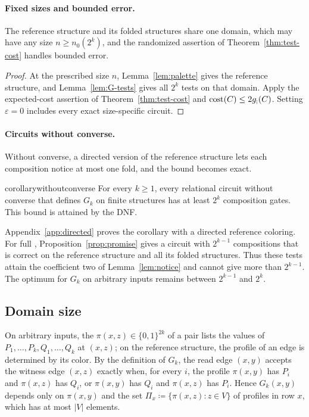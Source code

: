 \paragraph{Fixed sizes and bounded error.}
The reference structure and its folded structures share one domain,
which may have any size $n\ge n_0(2^k)$, and the randomized assertion of
Theorem~\ref{thm:test-cost} handles bounded error.
\randomizedbounds*
\begin{proof}
At the prescribed size $n$, Lemma~\ref{lem:palette} gives the reference
structure, and Lemma~\ref{lem:G-tests} gives all $2^k$ tests on that domain.
Apply the expected-cost assertion of Theorem~\ref{thm:test-cost} and
$\operatorname{cost}(C)\le2g_{;}(C)$. Setting $\varepsilon=0$ includes every exact
size-specific circuit.
\end{proof}

\paragraph{Circuits without converse.}
Without converse, a directed version of the reference structure lets
each composition notice at most one fold, and the bound becomes exact.
\begin{restatable}{corollary}{withoutconverse}\label{cor:without-converse}
For every $k\ge1$, every relational circuit without converse that
defines $G_k$ on finite structures has at least $2^k$ composition gates.
This bound is attained by the DNF.
\end{restatable}
Appendix~\ref{app:directed} proves the corollary with a directed
reference coloring. For full \CoR, Proposition~\ref{prop:promise} gives
a circuit with $2^{k-1}$ compositions that is correct on the reference
structure and all its folded structures. Thus these tests attain the
coefficient two of Lemma~\ref{lem:notice} and cannot give more than
$2^{k-1}$. The optimum for $G_k$ on arbitrary inputs remains between
$2^{k-1}$ and $2^k$.

\subsection{Domain size}\label{sec:domain-size}
On arbitrary inputs, the  $\pi(x,z)\in\{0,1\}^{2k}$ of a
pair lists the values of $P_1,\ldots,P_k,Q_1,\ldots,Q_k$ at $(x,z)$; on
the reference structure, the profile of an edge is determined by its color.
By the definition of $G_k$,
the read edge $(x,y)$ accepts the witness edge $(x,z)$ exactly when, for
every $i$, the profile $\pi(x,y)$ has $P_i$ and $\pi(x,z)$ has $Q_i$, or
$\pi(x,y)$ has $Q_i$ and $\pi(x,z)$ has $P_i$. Hence $G_k(x,y)$ depends
only on $\pi(x,y)$ and the set $\Pi_x\coloneqq\{\pi(x,z):z\in V\}$ of profiles in
row $x$, which has at most $|V|$ elements.

